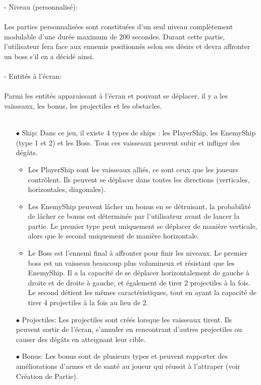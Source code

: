 \documentclass[a4paper,12pt]{article}
\begin{document}
- Niveau (personnalisé):\\ \\
Les parties personnalisées sont constituées d'un seul niveau complètement modulable d'une durée maximum de 200 secondes. Durant cette partie, l'utilisateur fera face aux ennemis positionnés selon ses désirs et devra affronter un boss s'il en a décidé ainsi.\\ \\

- Entités à l’écran:\\ \\
Parmi les entités apparaissant à l’écran et pouvant se déplacer, il y a les vaisseaux, les bonus, 
les projectiles et les obstacles.\\ \\
\begin{itemize}
    \item[$\bullet$ Ship:]Dans ce jeu, il existe 4 types de ships : les PlayerShip, les EnemyShip (type 1 et 2) et les Boss. Tous ces vaisseaux peuvent subir et infliger des dégâts. 
    \begin{itemize}
        \item Les PlayerShip sont les vaisseaux alliés, ce sont ceux que les joueurs contrôlent. Ils peuvent se déplacer dans toutes les directions (verticales, horizontales, diagonales).
        \item Les EnemyShip peuvent lâcher un bonus en se détruisant, la probabilité de lâcher ce bonus est déterminée par l’utilisateur avant de lancer la partie. Le premier type peut uniquement se déplacer de manière verticale, alors que le second uniquement de manière horizontale.
        \item Le Boss est l’ennemi final à affronter pour finir les niveaux. Le premier boss est un vaisseau beaucoup plus volumineux et résistant que les EnemyShip. Il a la capacité de se déplacer horizontalement de gauche à droite et de droite à gauche, et également de tirer 2 projectiles à la fois. Le second détient les mêmes caractéristiques, tout en ayant la capacité de tirer 4 projectiles à la fois au lieu de 2.\\
    \end{itemize}

    \item[$\bullet$ Projectiles:]Les projectiles sont créés lorsque les vaisseaux tirent. Ils peuvent sortir de l’écran, s’annuler en rencontrant d’autres projectiles ou causer des dégâts en atteignant leur cible.\\

    \item[$\bullet$ Bonus:]Les bonus sont de plusieurs types et peuvent rapporter des améliorations d’armes et de santé au joueur qui réussit à l'attraper (voir Création de Partie).
\end{itemize}
\newpage
\end{document}
